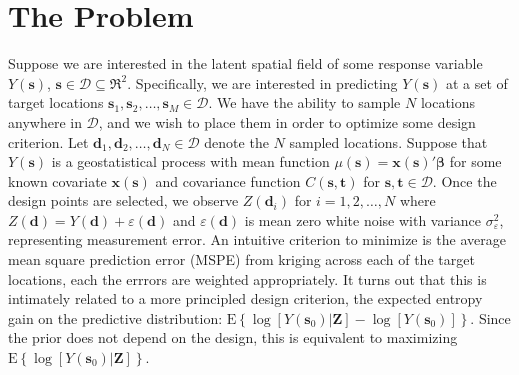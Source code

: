 \documentclass[12pt]{article}
\begin{document}
\section{The Problem}
Suppose we are interested in the latent spatial field of some response variable $Y(\bm{s})$, $\bm{s}\in \mathcal{D}\subseteq \Re^2$. Specifically, we are interested in predicting $Y(\bm{s})$ at a set of target locations $\bm{s}_1, \bm{s}_2, \dots, \bm{s}_M\in\mathcal{D}$. We have the ability to sample $N$ locations anywhere in $\mathcal{D}$, and we wish to place them in order to optimize some design criterion. Let $\bm{d}_1, \bm{d}_2, \dots, \bm{d}_N\in\mathcal{D}$ denote the $N$ sampled locations. Suppose that $Y(\bm{s})$ is a geostatistical process with mean function $\mu(\bm{s})=\bm{x}(\bm{s})'\bm{\beta}$ for some known covariate $\bm{x}(\bm{s})$ and covariance function $C(\bm{s}, \bm{t})$ for $\bm{s},\bm{t}\in\mathcal{D}$. Once the design points are selected, we observe $Z(\bm{d}_i)$ for $i=1,2,\dots,N$ where $Z(\bm{d}) = Y(\bm{d}) + \varepsilon(\bm{d})$ and $\varepsilon(\bm{d})$ is mean zero white noise with variance $\sigma^2_{\varepsilon}$, representing measurement error. An intuitive criterion to minimize is the average mean square prediction error (MSPE) from kriging across each of the target locations, each the errrors are weighted appropriately. It turns out that this is intimately related to a more principled design criterion, the expected entropy gain on the predictive distribution: $\mathrm{E}\left\{\log[Y(\bm{s}_0)|\bm{Z}] - \log[Y(\bm{s}_0)]\right\}$. Since the prior does not depend on the design, this is equivalent to maximizing $\mathrm{E}\left\{\log[Y(\bm{s}_0)|\bm{Z}]\right\}$.
\end{document}
